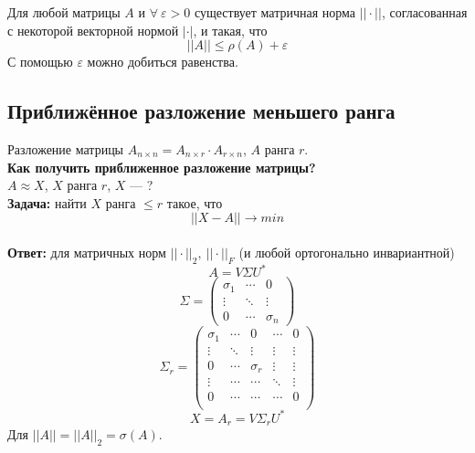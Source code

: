 \begin{statement}
    Для любой матрицы $A$ и $\forall~ \varepsilon>0$ существует матричная норма $||\cdot ||$, согласованная с некоторой векторной нормой $|\cdot|$, и такая, что $$||A||\leqslant \rho(A) + \varepsilon$$
    С помощью $\varepsilon$ можно добиться равенства.
\end{statement}

\subsection{Приближённое разложение меньшего ранга}
Разложение матрицы $A_{n \times n}=A_{n \times r} \cdot A_{r \times
    n}$, $A$ ранга $r$.\\
\textbf{Как получить приближенное разложение матрицы?}\\
$A\approx X$, $X$ ранга $r$, $X$ --- ?\\
\textbf{Задача:} найти $X$ ранга $\leqslant r$ такое, что $$||X-A||\to min$$\\
\textbf{Ответ:} для матричных норм $||\cdot||_2,~||\cdot||_F$ (и любой ортогонально инвариантной) $$A=V\Sigma U^*$$
\[\Sigma=\begin{pmatrix}
\sigma_1 & \cdots & 0\\
\vdots & \ddots & \vdots\\
0 & \cdots & \sigma_n
\end{pmatrix}\]
\[\Sigma_r=\begin{pmatrix}
\sigma_1 & \cdots & 0  & \cdots & 0\\
\vdots & \ddots & \vdots & \vdots & \vdots\\
0 & \cdots & \sigma_r &  \vdots & \vdots\\
\vdots & \cdots & \cdots & \ddots & \vdots\\
0 & \cdots & \cdots & \cdots & 0\\
\end{pmatrix}\]
$$X=A_r=V\Sigma_r U^*$$
Для $||A||=||A||_2=\sigma(A)$.
